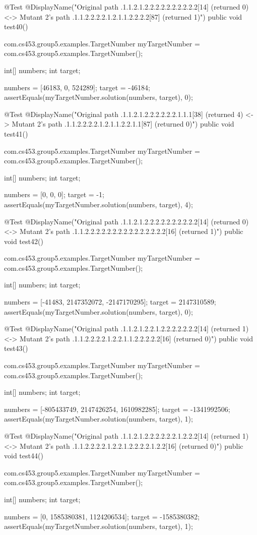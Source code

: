 @Test
@DisplayName("Original path .1.1.2.1.2.2.2.2.2.2.2.2.2.2[14] (returned 0) <-> Mutant 2's path .1.1.2.2.2.2.1.2.1.1.2.2.2.2[87] (returned 1)")
public void test40() {
    com.cs453.group5.examples.TargetNumber myTargetNumber = com.cs453.group5.examples.TargetNumber();

    int[] numbers;
    int target;

    numbers = [46183, 0, 524289];
    target = -46184;
    assertEquals(myTargetNumber.solution(numbers, target), 0);
}

@Test
@DisplayName("Original path .1.1.2.1.2.2.2.2.2.2.1.1.1[38] (returned 4) <-> Mutant 2's path .1.1.2.2.2.2.1.2.1.1.2.2.1.1[87] (returned 0)")
public void test41() {
    com.cs453.group5.examples.TargetNumber myTargetNumber = com.cs453.group5.examples.TargetNumber();

    int[] numbers;
    int target;

    numbers = [0, 0, 0];
    target = -1;
    assertEquals(myTargetNumber.solution(numbers, target), 4);
}

@Test
@DisplayName("Original path .1.1.2.1.2.2.2.2.2.2.2.2.2.2[14] (returned 0) <-> Mutant 2's path .1.1.2.2.2.2.2.2.2.2.2.2.2.2.2.2.2[16] (returned 1)")
public void test42() {
    com.cs453.group5.examples.TargetNumber myTargetNumber = com.cs453.group5.examples.TargetNumber();

    int[] numbers;
    int target;

    numbers = [-41483, 2147352072, -2147170295];
    target = 2147310589;
    assertEquals(myTargetNumber.solution(numbers, target), 0);
}

@Test
@DisplayName("Original path .1.1.2.1.2.2.1.2.2.2.2.2.2.2[14] (returned 1) <-> Mutant 2's path .1.1.2.2.2.2.1.2.2.1.1.2.2.2.2.2[16] (returned 0)")
public void test43() {
    com.cs453.group5.examples.TargetNumber myTargetNumber = com.cs453.group5.examples.TargetNumber();

    int[] numbers;
    int target;

    numbers = [-805433749, 2147426254, 1610982285];
    target = -1341992506;
    assertEquals(myTargetNumber.solution(numbers, target), 1);
}

@Test
@DisplayName("Original path .1.1.2.1.2.2.2.2.2.2.1.2.2.2[14] (returned 1) <-> Mutant 2's path .1.1.2.2.2.2.1.2.2.1.2.2.2.2.1.2.2[16] (returned 0)")
public void test44() {
    com.cs453.group5.examples.TargetNumber myTargetNumber = com.cs453.group5.examples.TargetNumber();

    int[] numbers;
    int target;

    numbers = [0, 1585380381, 1124206534];
    target = -1585380382;
    assertEquals(myTargetNumber.solution(numbers, target), 1);
}

